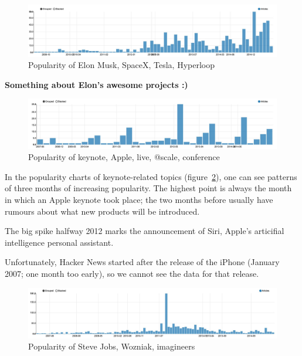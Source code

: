 \begin{figure}[H]
	\caption{Popularity of Elon Musk, SpaceX, Tesla, Hyperloop}
	\label{fig:trend_elon}
	\centering
	\includegraphics[width=14cm]{topic_trends/elon}
\end{figure}
\textbf{Something about Elon's awesome projects :)}

\begin{figure}[H]
	\caption{Popularity of keynote, Apple, live, @scale, conference}
	\label{fig:trend_keynote}
	\centering
	\includegraphics[width=14cm]{topic_trends/keynote}
\end{figure}
In the popularity charts of keynote-related topics (figure~\ref{fig:trend_keynote}), one can see patterns of three months of increasing popularity. The highest point is always the month in which an Apple keynote took place; the two months before usually have rumours about what new products will be introduced.

The big spike halfway 2012 marks the announcement of Siri, Apple's articifial intelligence personal assistant.

Unfortunately, Hacker News started after the release of the iPhone (January 2007; one month too early), so we cannot see the data for that release.

\begin{figure}[H]
	\caption{Popularity of Steve Jobs, Wozniak, imagineers}
	\label{fig:trend_jobs}
	\centering
	\includegraphics[width=14cm]{topic_trends/jobs}
\end{figure}

